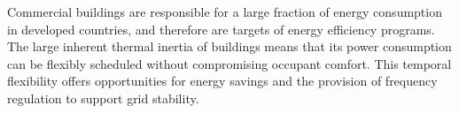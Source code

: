 \documentclass[../../thesis.tex]{subfiles}
\begin{document}
%


Commercial buildings are responsible for a large fraction of energy consumption in developed countries, and therefore are targets of energy efficiency programs. 
The large inherent thermal inertia of buildings means that its power consumption can be flexibly scheduled without compromising occupant comfort. 
This temporal flexibility offers opportunities for energy savings and the provision of frequency regulation to support grid stability. 
 
\end{document}
